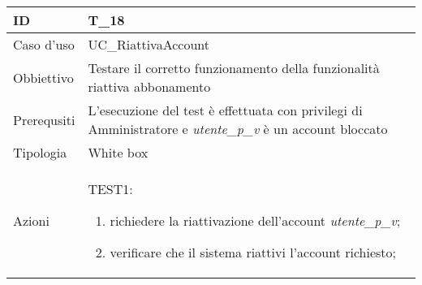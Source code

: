 \begin{table}[hb]
    \centering
    \begin{tabular}{ |p{2cm}|p{10cm}|  }
        \hline
        ID          & T\_18                                                                                                          \\\hline
        Caso d'uso  & UC\_RiattivaAccount                                                                                            \\\hline
        Obbiettivo  & Testare il corretto funzionamento della funzionalità riattiva abbonamento                                      \\\hline
        Prerequsiti & L'esecuzione del test è effettuata con privilegi di Amministratore e \emph{utente\_p\_v} è un account bloccato \\\hline
        Tipologia   & White box                                                                                                      \\\hline
        Azioni      &
        TEST1:
        \begin{enumerate}[nosep, topsep=0pt]
            \item richiedere la riattivazione dell'account \emph{utente\_p\_v};
            \item verificare che il sistema riattivi l'account richiesto;
        \end{enumerate}
        \\\hline
    \end{tabular}
\end{table}

